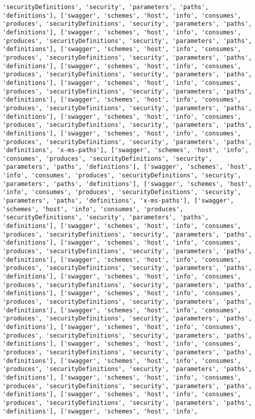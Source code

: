 \documentclass[11pt]{article}
\begin{document}
\begin{Verbatim}[commandchars=\\\{\}]
'securityDefinitions', 'security', 'parameters', 'paths', 'definitions'], ['swagger', 'schemes', 'host', 'info', 'consumes', 'produces', 'securityDefinitions', 'security', 'parameters', 'paths', 'definitions'], ['swagger', 'schemes', 'host', 'info', 'consumes', 'produces', 'securityDefinitions', 'security', 'parameters', 'paths', 'definitions'], ['swagger', 'schemes', 'host', 'info', 'consumes', 'produces', 'securityDefinitions', 'security', 'parameters', 'paths', 'definitions'], ['swagger', 'schemes', 'host', 'info', 'consumes', 'produces', 'securityDefinitions', 'security', 'parameters', 'paths', 'definitions'], ['swagger', 'schemes', 'host', 'info', 'consumes', 'produces', 'securityDefinitions', 'security', 'parameters', 'paths', 'definitions'], ['swagger', 'schemes', 'host', 'info', 'consumes', 'produces', 'securityDefinitions', 'security', 'parameters', 'paths', 'definitions'], ['swagger', 'schemes', 'host', 'info', 'consumes', 'produces', 'securityDefinitions', 'security', 'parameters', 'paths', 'definitions'], ['swagger', 'schemes', 'host', 'info', 'consumes', 'produces', 'securityDefinitions', 'security', 'parameters', 'paths', 'definitions', 'x-ms-paths'], ['swagger', 'schemes', 'host', 'info', 'consumes', 'produces', 'securityDefinitions', 'security', 'parameters', 'paths', 'definitions'], ['swagger', 'schemes', 'host', 'info', 'consumes', 'produces', 'securityDefinitions', 'security', 'parameters', 'paths', 'definitions'], ['swagger', 'schemes', 'host', 'info', 'consumes', 'produces', 'securityDefinitions', 'security', 'parameters', 'paths', 'definitions', 'x-ms-paths'], ['swagger', 'schemes', 'host', 'info', 'consumes', 'produces', 'securityDefinitions', 'security', 'parameters', 'paths', 'definitions'], ['swagger', 'schemes', 'host', 'info', 'consumes', 'produces', 'securityDefinitions', 'security', 'parameters', 'paths', 'definitions'], ['swagger', 'schemes', 'host', 'info', 'consumes', 'produces', 'securityDefinitions', 'security', 'parameters', 'paths', 'definitions'], ['swagger', 'schemes', 'host', 'info', 'consumes', 'produces', 'securityDefinitions', 'security', 'parameters', 'paths', 'definitions'], ['swagger', 'schemes', 'host', 'info', 'consumes', 'produces', 'securityDefinitions', 'security', 'parameters', 'paths', 'definitions'], ['swagger', 'schemes', 'host', 'info', 'consumes', 'produces', 'securityDefinitions', 'security', 'parameters', 'paths', 'definitions'], ['swagger', 'schemes', 'host', 'info', 'consumes', 'produces', 'securityDefinitions', 'security', 'parameters', 'paths', 'definitions'], ['swagger', 'schemes', 'host', 'info', 'consumes', 'produces', 'securityDefinitions', 'security', 'parameters', 'paths', 'definitions'], ['swagger', 'schemes', 'host', 'info', 'consumes', 'produces', 'securityDefinitions', 'security', 'parameters', 'paths', 'definitions'], ['swagger', 'schemes', 'host', 'info', 'consumes', 'produces', 'securityDefinitions', 'security', 'parameters', 'paths', 'definitions'], ['swagger', 'schemes', 'host', 'info', 'consumes', 'produces', 'securityDefinitions', 'security', 'parameters', 'paths', 'definitions'], ['swagger', 'schemes', 'host', 'info', 'consumes', 'produces', 'securityDefinitions', 'security', 'parameters', 'paths', 'definitions'], ['swagger', 'schemes', 'host', 'info', 
\end{Verbatim}
\end{document}
